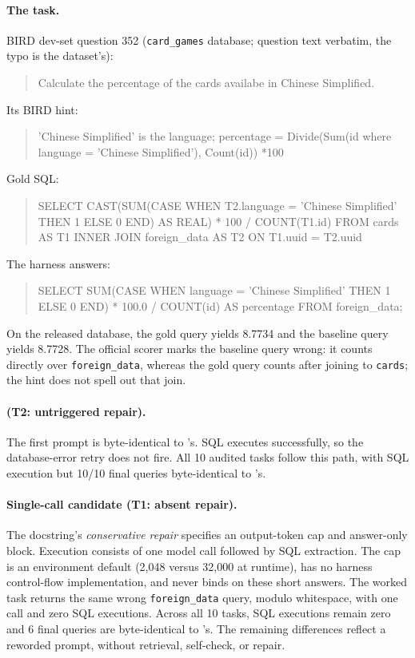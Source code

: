 \paragraph{The task.} BIRD dev-set question 352 (\texttt{card\_games}
database; question text verbatim, the typo is the dataset's):
\begin{quote}\small\ttfamily
Calculate the percentage of the cards availabe in Chinese Simplified.
\end{quote}
Its BIRD hint:
\begin{quote}\small\ttfamily
'Chinese Simplified' is the language; percentage = Divide(Sum(id where
language = 'Chinese Simplified'), Count(id)) *100
\end{quote}
Gold SQL:
\begin{quote}\small\ttfamily
SELECT CAST(SUM(CASE WHEN T2.language = 'Chinese Simplified' THEN 1 ELSE 0
END) AS REAL) * 100 / COUNT(T1.id) FROM cards AS T1 INNER JOIN foreign\_data
AS T2 ON T1.uuid = T2.uuid
\end{quote}
The \bare{} harness answers:
\begin{quote}\small\ttfamily
SELECT SUM(CASE WHEN language = 'Chinese Simplified' THEN 1 ELSE 0 END) *
100.0 / COUNT(id) AS percentage FROM foreign\_data;
\end{quote}
On the released database, the gold query yields 8.7734 and the baseline
query yields 8.7728. The official scorer marks the baseline query wrong:
it counts directly over
\texttt{foreign\_data}, whereas the gold query counts after joining to
\texttt{cards}; the hint does not spell out that join.

\paragraph{\react{} (T2: untriggered repair).}
The first prompt is byte-identical to \bare{}'s. SQL executes successfully,
so the database-error retry does not fire. All 10 audited tasks follow
this path, with SQL execution but 10/10 final queries byte-identical to
\bare{}'s.

\paragraph{Single-call candidate (T1: absent repair).}
The docstring's \emph{conservative repair} specifies an output-token cap
and answer-only block. Execution consists of one model call followed
by SQL extraction. The cap is an environment default (2{,}048 versus
32{,}000 at runtime), has no harness control-flow implementation, and
never binds on these short answers. The worked task returns the same
wrong \texttt{foreign\_data} query, modulo whitespace, with one call
and zero SQL executions. Across all 10 tasks, SQL executions remain zero
and 6 final queries are byte-identical to \bare{}'s. The remaining
differences reflect a reworded prompt, without retrieval, self-check,
or repair.

